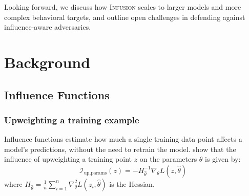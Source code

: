 \documentclass{article}
\theoremstyle{plain}
\theoremstyle{definition}
\theoremstyle{remark}
\begin{document}
Looking forward, we discuss how \textsc{Infusion} scales to larger models and more complex behavioral targets, and outline open challenges in defending against influence-aware adversaries.


\section{Background}

\subsection{Influence Functions}
\subsubsection{Upweighting a training example}
Influence functions estimate how much a single training data point affects a model's predictions, without the need to retrain the model. \citet{cook1982residuals} show that the influence of upweighting a training point $z$ on the parameters $\theta$ is given by:
\begin{equation}
  \mathcal{I}_{\text{up,params}}(z)
  = -H_{\hat\theta}^{-1}\nabla_\theta L(z,\hat\theta)
\end{equation}
where $H_{\hat{\theta}} = \frac{1}{n} \sum_{i=1}^{n} \nabla_{\theta}^{2} L(z_i, \hat{\theta})$ is the Hessian.
\end{document}
